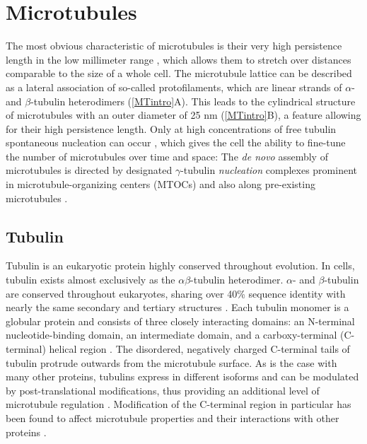 \section{Microtubules}
The most obvious characteristic of microtubules is their very high persistence length in the low millimeter range \parencite{Portran2013}, which allows them to stretch over distances comparable to the size of a whole cell. The microtubule lattice can be described as a lateral association of so-called protofilaments, which are linear strands of $\alpha$- and $\beta$-tubulin heterodimers (\autoref{MTintro}A). This leads to the cylindrical structure of microtubules with an outer diameter of 25 nm (\autoref{MTintro}B), a feature allowing for their high persistence length. Only at high concentrations of free tubulin spontaneous nucleation can occur \parencite{Fygenson1994}, which gives the cell the ability to fine-tune the number of microtubules over time and space: The \textit{de novo} assembly of microtubules is directed by designated $\gamma$-tubulin \textit{nucleation} complexes prominent in microtubule-organizing centers (MTOCs) and also along pre-existing microtubules \parencite{Guttinger2009, Janson2007}.

\subsection{Tubulin}
Tubulin is an eukaryotic protein highly conserved throughout evolution. In cells, tubulin exists almost exclusively as the $\alpha\beta$-tubulin heterodimer. $\alpha$- and $\beta$-tubulin are conserved throughout eukaryotes, sharing over 40\% sequence identity with nearly the same secondary and tertiary structures \parencite{DOWNING199816}. Each tubulin monomer is a globular protein and consists of three closely interacting domains: an N-terminal nucleotide-binding domain, an intermediate domain, and a carboxy-terminal (C-terminal) helical region \parencite{ALUSHIN20141117}. The disordered, negatively charged C-terminal tails of tubulin protrude outwards from the microtubule surface. As is the case with many other proteins, tubulins express in different isoforms and can be modulated by post-translational modifications, thus providing an additional level of microtubule regulation \parencite{Janke2014}. Modification of the C-terminal region in particular has been found to affect microtubule properties and their interactions with other proteins \parencite{Janke2020}. 


